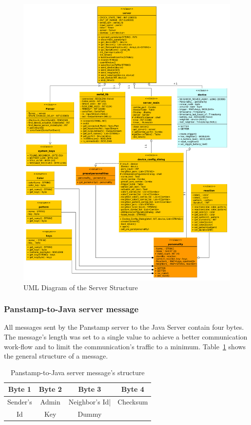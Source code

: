\begin{figure}[ht]
	\centerline{\includegraphics[width=\textwidth]{./graph/general.pdf}}
	\caption{UML Diagram of the Server Structure}
	\label{fig:server_uml}
\end{figure}


\subsubsection{Panstamp-to-Java server message}
All messages sent by the Panstamp server to the Java Server contain four bytes. The message's length was set to a single value to achieve a better communication work-flow and to limit the communication's traffic to a minimum. Table~\ref{Panstamp-to-Java} shows the general structure of a message.


\begin{table}[h]
  \centering
  \begin{tabular}{ c | c | c | c }
    \hline
    \textbf{Byte 1} & \textbf{Byte 2} & \textbf{Byte 3} & \textbf{Byte 4} \\ [0.5ex]    
    \hline
    Sender's & Admin & Neighbor's Id| & Checksum  \\
    Id & Key & Dummy & \\
    \hline
  \end{tabular}
  \caption[Pamstamp-to-Java]%
          {Panstamp-to-Java server message's structure}
  \label{Panstamp-to-Java}
\end{table}

